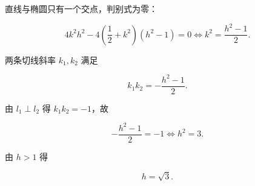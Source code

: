 \begin{answer}
直线与椭圆只有一个交点，判别式为零：

\nopagebreak[4]
\[4k^2h^2-4\left(\frac12+k^2\right)(h^2-1)=0
\iff k^2=\frac{h^2-1}2.\]

两条切线斜率 $k_1,k_2$ 满足

\nopagebreak[4]
\[k_1k_2=-\frac{h^2-1}2.\]

由 $l_1\perp l_2$ 得 $k_1k_2=-1$，故

\nopagebreak[4]
\[-\frac{h^2-1}2=-1\iff h^2=3.\]

由 $h>1$ 得

\nopagebreak[4]
\[h=\sqrt3.\]


\end{answer}
